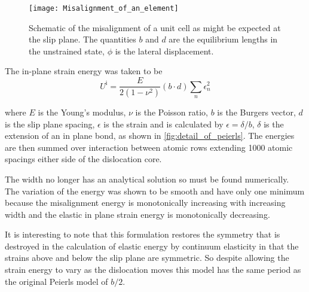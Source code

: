 \begin{figure}
\centering
\texttt{[image: Misalignment\_of\_an\_element]}
\captionsetup{width=0.5\textwidth}
\caption[Schematic of a misaligned unit cell]{Schematic of the misalignment of a unit cell as might be expected at the slip plane. The quantities $b$ and $d$ are the equilibrium lengths in the unstrained state, $\phi$ is the lateral displacement. \label{fig:schematic_misalignment}}
\end{figure}

The in-plane strain energy was taken to be 
\begin{equation}
U^{\text{i}} = \frac{E}{2(1-\nu^2)} (b\cdot d) \sum_n \epsilon_n^2
\end{equation}

where $E$ is the Young's modulus, $\nu$ is the Poisson ratio, $b$ is the Burgers vector, $d$ is the slip plane spacing, $\epsilon$ is the strain and is calculated by $\epsilon = \delta/b$, $\delta$ is the extension of an in plane bond, as shown in \autoref{fig:detail_of_peierls}. The energies are then summed over interaction between atomic rows extending 1000 atomic spacings either side of the dislocation core.

The width no longer has an analytical solution so must be found numerically. The variation of the energy was shown to be smooth and have only one minimum because the misalignment energy is monotonically increasing with increasing width and the elastic in plane strain energy is monotonically decreasing.

It is interesting to note that this formulation restores the symmetry that is destroyed in the calculation of elastic energy by continuum elasticity in that the strains above and below the slip plane are symmetric. So despite allowing the strain energy to vary as the dislocation moves this model has the same period as the original Peierls model of $b/2$.


